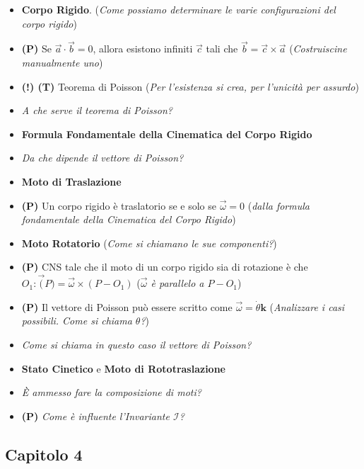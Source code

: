 \documentclass[11pt,a4paper,twoside]{article}
\begin{document}
\begin{itemize}
	\item \textbf{Corpo Rigido}. (\textit{Come possiamo determinare le varie configurazioni del corpo rigido})
	\item \textbf{(P)} Se $\vec a \cdot \vec b = 0$, allora esistono infiniti $\vec c$ tali che $\vec b = \vec c \times \vec a$ (\textit{Costruiscine manualmente uno})
	\item \textbf{(!) (T)} Teorema di Poisson (\textit{Per l'esistenza si crea, per l'unicità per assurdo})
	\item \textit{A che serve il teorema di Poisson?}
	\item \textbf{Formula Fondamentale della Cinematica del Corpo Rigido}
	\item \textit{Da che dipende il vettore di Poisson?}
	\item \textbf{Moto di Traslazione}
	\item \textbf{(P)} Un corpo rigido è traslatorio se e solo se $\vec \omega = 0$ (\textit{dalla formula fondamentale della Cinematica del Corpo Rigido})
	\item \textbf{Moto Rotatorio} (\textit{Come si chiamano le sue componenti?})
	\item \textbf{(P)} CNS tale che il moto di un corpo rigido sia di rotazione è che $O_1:\vec (P) = \vec \omega \times (P-O_1)$ (\textit{$\vec \omega$ è parallelo a $P-O_1$})
	\item \textbf{(P)} Il vettore di Poisson può essere scritto come $\vec \omega = \dot \theta \mathbf k$ (\textit{Analizzare i casi possibili. Come si chiama $\theta$?})
	\item \textit{Come si chiama in questo caso il vettore di Poisson?}
	\item \textbf{Stato Cinetico} e \textbf{Moto di Rototraslazione}
	\item \textit{È ammesso fare la composizione di moti?}
	\item \textbf{(P)} \textit{Come è influente l'Invariante $\mathcal I$?}
\end{itemize}

\subsection*{Capitolo 4}
\end{document}
